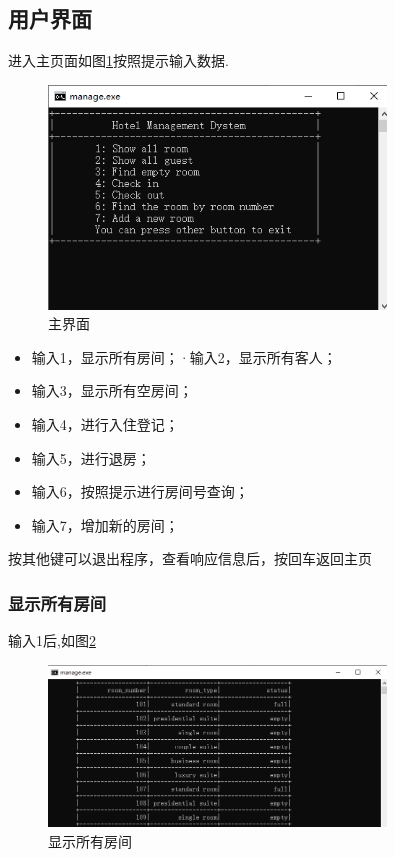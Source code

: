 \documentclass[UTF8]{ctexart}
\begin{document}
  \subsection{用户界面}
    进入主页面如图\ref{fig:home}按照提示输入数据.
    \begin{figure}[H]
      \centering
      \includegraphics[width=0.8\textwidth]{home}
      \caption{主界面}
      \label{fig:home}
    \end{figure}
    \begin{itemize}
      \item 输入1，显示所有房间；·输入2，显示所有客人；
      \item 输入3，显示所有空房间；
      \item 输入4，进行入住登记；
      \item 输入5，进行退房；
      \item 输入6，按照提示进行房间号查询；
      \item 输入7，增加新的房间；
    \end{itemize}
    按其他键可以退出程序，查看响应信息后，按回车返回主页
    \subsubsection{显示所有房间}
      输入1后,如图\ref{fig:1}
      \begin{figure}[H]
        \centering
        \includegraphics[width=0.8\textwidth]{1}
        \caption{显示所有房间}
        \label{fig:1}
      \end{figure}
\end{document}
